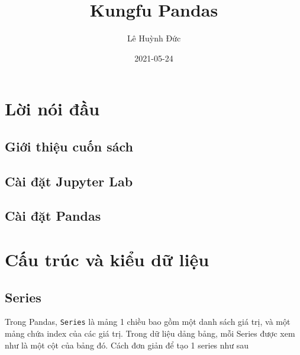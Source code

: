 \documentclass[
]{book}
\title{Kungfu Pandas}
\author{Lê Huỳnh Đức}
\date{2021-05-24}
\begin{document}
\maketitle

{
\setcounter{tocdepth}{1}
\tableofcontents
}
\hypertarget{lux1eddi-nuxf3i-ux111ux1ea7u}{%
\chapter*{Lời nói đầu}\label{lux1eddi-nuxf3i-ux111ux1ea7u}}

\hypertarget{giux1edbi-thiux1ec7u-cuux1ed1n-suxe1ch}{%
\section*{Giới thiệu cuốn sách}\label{giux1edbi-thiux1ec7u-cuux1ed1n-suxe1ch}}

\hypertarget{cuxe0i-ux111ux1eb7t-jupyter-lab}{%
\section*{Cài đặt Jupyter Lab}\label{cuxe0i-ux111ux1eb7t-jupyter-lab}}

\hypertarget{cuxe0i-ux111ux1eb7t-pandas}{%
\section*{Cài đặt Pandas}\label{cuxe0i-ux111ux1eb7t-pandas}}

\hypertarget{cux1ea5u-truxfac-vuxe0-kiux1ec3u-dux1eef-liux1ec7u}{%
\chapter{Cấu trúc và kiểu dữ liệu}\label{cux1ea5u-truxfac-vuxe0-kiux1ec3u-dux1eef-liux1ec7u}}

\hypertarget{series}{%
\section{Series}\label{series}}

Trong Pandas, \texttt{Series} là mảng 1 chiều bao gồm một danh sách giá trị, và một mảng chứa index của các giá trị. Trong dữ liệu dảng bảng, mỗi Series được xem như là một cột của bảng đó. Cách đơn giản để tạo 1 series như sau
\end{document}
